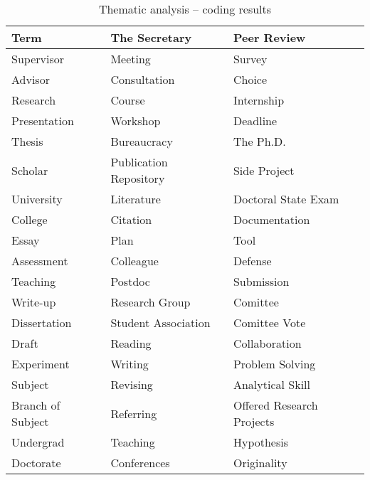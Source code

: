 
\begin{table}[h]
\small
\caption{Thematic analysis -- coding results}
\begin{tabular}{|l|l|l|}
\hline
Term              & The Secretary          & Peer Review                   \\ \hline
Supervisor        & Meeting                & Survey                        \\ \hline
Advisor           & Consultation           & Choice                        \\ \hline
Research          & Course                 & Internship                    \\ \hline
Presentation      & Workshop               & Deadline                      \\ \hline
Thesis            & Bureaucracy            & The Ph.D.                     \\ \hline
Scholar           & Publication Repository & Side Project                  \\ \hline
University        & Literature             & Doctoral State Exam           \\ \hline
College           & Citation               & Documentation                 \\ \hline
Essay             & Plan                   & Tool                          \\ \hline
Assessment        & Colleague              & Defense                       \\ \hline
Teaching          & Postdoc                & Submission                    \\ \hline
Write-up          & Research Group         & Comittee                      \\ \hline
Dissertation      & Student Association    & Comittee Vote                 \\ \hline
Draft             & Reading                & Collaboration                 \\ \hline
Experiment        & Writing                & Problem Solving               \\ \hline
Subject           & Revising               & Analytical Skill              \\ \hline
Branch of Subject & Referring              & Offered Research Projects     \\ \hline
Undergrad         & Teaching               & Hypothesis                    \\ \hline
Doctorate         & Conferences            & Originality                   \\ \hline

\end{tabular}
\end{table}
